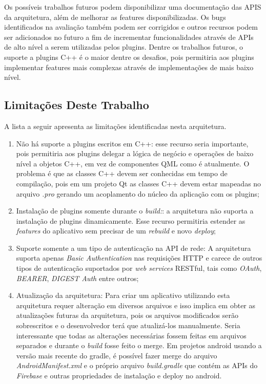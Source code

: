 Os possíveis trabalhos futuros podem disponibilizar uma documentação das APIS da arquitetura, além de melhorar as features disponibilizadas. Os bugs identificados na avaliação também podem ser corrigidos e outros recursos podem ser adicionados no futuro a fim de incrementar funcionalidades através de APIs de alto nível a serem utilizadas pelos plugins. Dentre os trabalhos futuros, o suporte a plugins C++ é o maior dentre os desafios, pois permitiria aos plugins implementar features mais complexas através de implementações de mais baixo nível.

\subsection{Limitações Deste Trabalho}
A lista a seguir apresenta as limitações identificadas nesta arquitetura.

\begin{enumerate}
	\item Não há suporte a plugins escritos em C++: esse recurso seria importante, pois permitiria aos plugins delegar a lógica de negócio e operações de baixo nível a objetos C++, em vez de componentes QML como é atualmente. O problema é que as classes C++ devem ser conhecidas em tempo de compilação, pois em um projeto Qt as classes C++ devem estar mapeadas no arquivo \textit{.pro} gerando um acoplamento do núcleo da aplicação com os plugins;

	\item Instalação de plugins somente durante o \textit{build:}: a arquitetura não suporta a instalação de plugins dinamicamente. Esse recurso permitiria estender as \textit{features} do aplicativo sem precisar de um \textit{rebuild} e novo \textit{deploy};

	\item Suporte somente a um tipo de autenticação na API de rede: A arquitetura suporta apenas \textit{Basic Authentication} nas requisições HTTP e carece de outros tipos de autenticação suportados por \textit{web services} RESTful, tais como \textit{OAuth}, \textit{BEARER}, \textit{DIGEST Auth} entre outros;

	\item Atualização da arquitetura: Para criar um aplicativo utilizando esta arquitetura requer alteração em diversos arquivos e isso implica em obter as atualizações futuras da arquitetura, pois os arquivos modificados serão sobrescritos e o desenvolvedor terá que atualizá-los manualmente. Seria interessante que todas as alterações necessárias fossem feitas em arquivos separados e durante o \textit{build} fosse feito o merge. Em projetos android usando a versão mais recente do gradle, é possível fazer merge do arquivo \textit{AndroidManifest.xml} e o próprio arquivo \textit{build.gradle} que contém as APIs do \textit{Firebase} e outras propriedades de instalação e deploy no android.
\end{enumerate}


